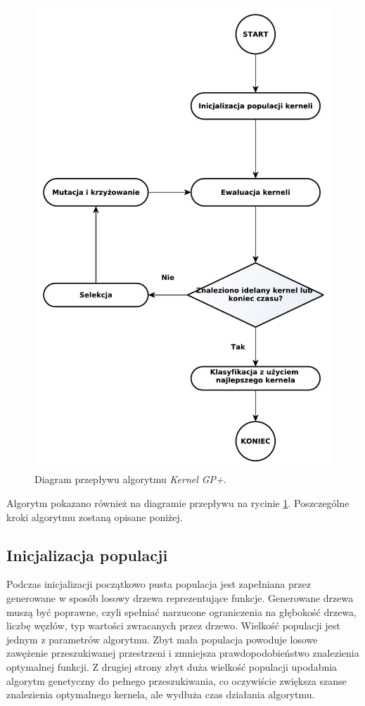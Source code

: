 \begin{figure}[h]
\centering
\includegraphics[scale=0.5]{figures/graphs/algorithm}
\caption{Diagram przepływu algorytmu \emph{Kernel GP+}.\label{fig:algorithm}}
\end{figure}

Algorytm pokazano również na diagramie przepływu na rycinie \ref{fig:algorithm}. 
Poszczególne kroki algorytmu zostaną opisane poniżej.

\subsection{Inicjalizacja populacji}
Podczas inicjalizacji początkowo pusta populacja jest zapełniana przez generowane w sposób losowy drzewa reprezentujące funkcje. Generowane drzewa muszą być poprawne, czyli spełniać narzucone ograniczenia na głębokość drzewa, liczbę węzłów, typ wartości zwracanych przez drzewo.
Wielkość populacji jest jednym z parametrów algorytmu. Zbyt mała populacja powoduje losowe zawężenie przeszukiwanej przestrzeni i zmniejsza prawdopodobieństwo znalezienia optymalnej funkcji. Z drugiej strony zbyt duża wielkość populacji upodabnia algorytm genetyczny do pełnego przeszukiwania, co oczywiście zwiększa szanse znalezienia optymalnego kernela, ale wydłuża czas działania algorytmu.

